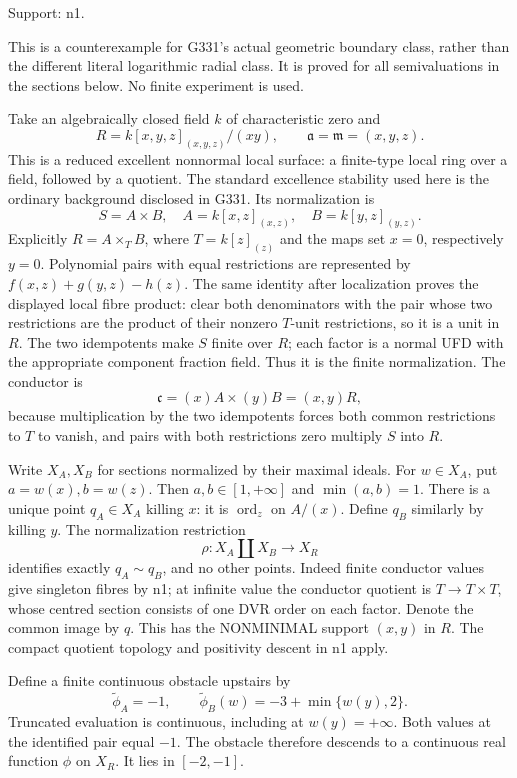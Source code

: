 \documentclass[11pt]{article}
\begin{document}
Support: n1.

This is a counterexample for G331's actual geometric boundary class, rather than the different literal logarithmic radial class. It is proved for all semivaluations in the sections below. No finite experiment is used.

Take an algebraically closed field \(k\) of characteristic zero and
\[
R=k[x,y,z]_{(x,y,z)}/(xy),\qquad \mathfrak a=\mathfrak m=(x,y,z).
\]
This is a reduced excellent nonnormal local surface: a finite-type local ring over a field, followed by a quotient. The standard excellence stability used here is the ordinary background disclosed in G331. Its normalization is
\[
S=A\times B,\quad A=k[x,z]_{(x,z)},\quad B=k[y,z]_{(y,z)}.
\]
Explicitly \(R=A\times_T B\), where \(T=k[z]_{(z)}\) and the maps set \(x=0\), respectively \(y=0\). Polynomial pairs with equal restrictions are represented by \(f(x,z)+g(y,z)-h(z)\). The same identity after localization proves the displayed local fibre product: clear both denominators with the pair whose two restrictions are the product of their nonzero \(T\)-unit restrictions, so it is a unit in \(R\). The two idempotents make \(S\) finite over \(R\); each factor is a normal UFD with the appropriate component fraction field. Thus it is the finite normalization. The conductor is
\[
\mathfrak c=(x)A\times(y)B=(x,y)R,
\]
because multiplication by the two idempotents forces both common restrictions to \(T\) to vanish, and pairs with both restrictions zero multiply \(S\) into \(R\).

Write \(X_A,X_B\) for sections normalized by their maximal ideals. For \(w\in X_A\), put \(a=w(x),b=w(z)\). Then \(a,b\in[1,+\infty]\) and \(\min(a,b)=1\). There is a unique point \(q_A\in X_A\) killing \(x\): it is \(\operatorname{ord}_z\) on \(A/(x)\). Define \(q_B\) similarly by killing \(y\). The normalization restriction 
\[
\rho:X_A\amalg X_B\longrightarrow X_R
\]
identifies exactly \(q_A\sim q_B\), and no other points. Indeed finite conductor values give singleton fibres by n1; at infinite value the conductor quotient is \(T\to T\times T\), whose centred section consists of one DVR order on each factor. Denote the common image by \(q\). This has the NONMINIMAL support \((x,y)\) in \(R\). The compact quotient topology and positivity descent in n1 apply.

Define a finite continuous obstacle upstairs by
\[
\widetilde\phi_A=-1,\qquad
\widetilde\phi_B(w)=-3+\min\{w(y),2\}. \tag{4}
\]
Truncated evaluation is continuous, including at \(w(y)=+\infty\). Both values at the identified pair equal \(-1\). The obstacle therefore descends to a continuous real function \(\phi\) on \(X_R\). It lies in \([-2,-1]\).
\end{document}
